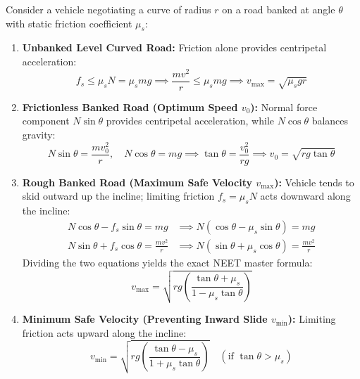 \documentclass[10pt,a4paper]{article}
\begin{document}
\begin{formulabox}
Consider a vehicle negotiating a curve of radius $r$ on a road banked at angle $\theta$ with static friction coefficient $\mu_s$:
\begin{enumerate}[leftmargin=*]
  \item \textbf{Unbanked Level Curved Road:} Friction alone provides centripetal acceleration:
  \begin{equation}
    f_s \le \mu_s N = \mu_s mg \implies \frac{mv^2}{r} \le \mu_s mg \implies v_{\max} = \sqrt{\mu_s g r}
  \end{equation}
  \item \textbf{Frictionless Banked Road (Optimum Speed $v_0$):} Normal force component $N\sin\theta$ provides centripetal acceleration, while $N\cos\theta$ balances gravity:
  \begin{equation}
    N\sin\theta = \frac{mv_0^2}{r}, \quad N\cos\theta = mg \implies \tan\theta = \frac{v_0^2}{rg} \implies v_0 = \sqrt{rg\tan\theta}
  \end{equation}
  \item \textbf{Rough Banked Road (Maximum Safe Velocity $v_{\max}$):} Vehicle tends to skid outward up the incline; limiting friction $f_s = \mu_s N$ acts downward along the incline:
  \begin{align}
    N\cos\theta - f_s\sin\theta = mg &\implies N(\cos\theta - \mu_s\sin\theta) = mg \\
    N\sin\theta + f_s\cos\theta = \frac{mv^2}{r} &\implies N(\sin\theta + \mu_s\cos\theta) = \frac{mv^2}{r}
  \end{align}
  Dividing the two equations yields the exact NEET master formula:
  \begin{equation}
    v_{\max} = \sqrt{rg\left(\frac{\tan\theta + \mu_s}{1 - \mu_s\tan\theta}\right)}
  \end{equation}
  \item \textbf{Minimum Safe Velocity (Preventing Inward Slide $v_{\min}$):} Limiting friction acts upward along the incline:
  \begin{equation}
    v_{\min} = \sqrt{rg\left(\frac{\tan\theta - \mu_s}{1 + \mu_s\tan\theta}\right)} \quad (\text{if } \tan\theta > \mu_s)
  \end{equation}
\end{enumerate}
\end{formulabox}
\end{document}
